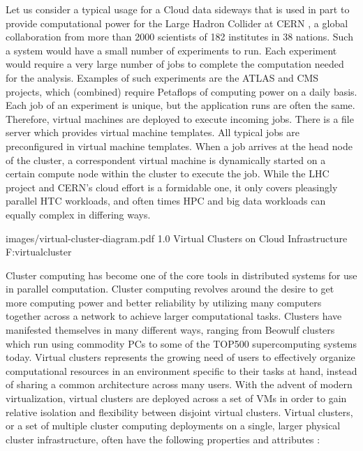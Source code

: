 Let us consider a typical usage for a Cloud data sideways that is used in part to provide computational power for the Large Hadron Collider at CERN \cite{CERN2003}, a global collaboration from more than 2000 scientists of 182 institutes in 38 nations.  Such a system would have a small number of experiments to run. Each experiment would require a very large number of jobs to complete the computation needed for the analysis.  Examples of such experiments are the ATLAS \cite{luo2005gsp} and CMS \cite{cms} projects, which (combined) require Petaflops of computing power on a daily basis.  Each job of an experiment is unique, but the application runs are often the same.  Therefore, virtual machines are deployed to execute incoming jobs. There is a file server which provides virtual machine templates. All typical jobs are preconfigured in virtual machine templates. When a job arrives at the head node of the  cluster, a correspondent virtual machine is dynamically started on a certain compute node within the cluster to execute the job.  While the LHC project and CERN's cloud effort is a formidable one, it only covers pleasingly parallel HTC workloads, and often times HPC and big data workloads can equally complex in differing ways.


  {images/virtual-cluster-diagram.pdf}
  {1.0}
  {Virtual Clusters on Cloud Infrastructure}
  {F:virtualcluster}


Cluster computing has become one of the core tools in distributed systems for use in parallel computation.%
Cluster computing revolves around the desire to get more computing power and better reliability by utilizing many computers together across a network to achieve larger computational tasks. Clusters have manifested themselves in many different ways, ranging from Beowulf clusters \cite{sterling2001beowulf} which run using commodity PCs to some of the TOP500 \cite{www-top500} supercomputing systems today.  Virtual clusters represents the growing need of users to effectively organize computational resources in an environment specific to their tasks at hand, instead of sharing a common architecture across many users. With the advent of modern virtualization, virtual clusters are deployed across a set of VMs in order to gain relative isolation and flexibility between disjoint virtual clusters. Virtual clusters, or a set of multiple cluster computing deployments on a single, larger physical cluster infrastructure, often have the following properties and attributes \cite{hwang2013distributed}:

